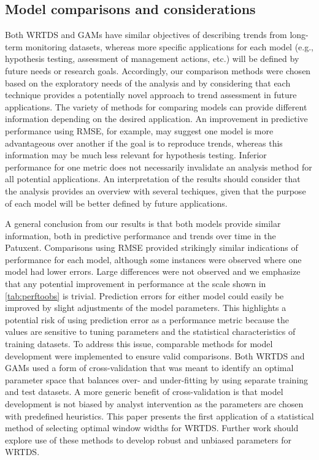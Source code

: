 \documentclass{svjour3}\usepackage[]{graphicx}\usepackage[]{color}
\begin{document}
\subsection{Model comparisons and considerations}

Both \ac{WRTDS} and \acp{GAM} have similar objectives of describing trends from long-term monitoring datasets, whereas more specific applications for each model (e.g., hypothesis testing, assessment of management actions, etc.) will be defined by future needs or research goals.  Accordingly, our comparison methods were chosen based on the exploratory needs of the analysis and by considering that each technique provides a potentially novel approach to trend assessment in future applications.  The variety of methods for comparing models can provide different information depending on the desired application.  An improvement in predictive performance using \ac{RMSE}, for example, may suggest one model is more advantageous over another if the goal is to reproduce trends, whereas this information may be much less relevant for hypothesis testing. Inferior performance for one metric does not necessarily invalidate an analysis method for all potential applications.  An interpretation of the results should consider that the analysis provides an overview with several techiques, given that the purpose of each model will be better defined by future applications. 

A general conclusion from our results is that both models provide similar information, both in predictive performance and trends over time in the Patuxent.  Comparisons using \ac{RMSE} provided strikingly similar indications of performance for each model, although some instances were observed where one model had lower errors.  Large differences were not observed and we emphasize that any potential improvement in performance at the scale shown in \cref{tab:perftoobs} is trivial.  Prediction errors for either model could easily be improved by slight adjustments of the model parameters.  This highlights a potential risk of using prediction error as a performance metric because the values are sensitive to tuning parameters and the statistical characteristics of training datasets. To address this issue, comparable methods for model development were implemented to ensure valid comparisons.  Both \ac{WRTDS} and \acp{GAM} used a form of cross-validation that was meant to identify an optimal parameter space that balances over- and under-fitting by using separate training and test datasets.  A more generic benefit of cross-validation is that model development is not biased by analyst intervention as the parameters are chosen with predefined heuristics.  This paper presents the first application of a statistical method of selecting optimal window widths for \ac{WRTDS}.  Further work should explore use of these methods to develop robust and unbiased parameters for \ac{WRTDS}. 
  
\end{document}
